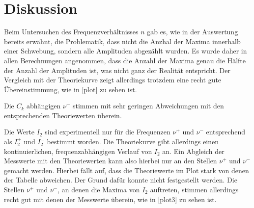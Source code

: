 \section{Diskussion}
\label{sec:Diskussion}

Beim Untersuchen des Frequenzverhältnisses $n$ gab es, wie in der Auswertung bereits erwähnt, die Problematik, dass nicht die Anzhal der 
Maxima innerhalb einer Schwebung, sondern alle Amplituden abgezählt wurden. Es wurde daher in allen Berechnungen angenommen, dass die 
Anzahl der Maxima genau die Hälfte der Anzahl der Amplituden ist, was nicht ganz der Realität entspricht. Der Vergleich mit der 
Theoriekurve zeigt allerdings trotzdem eine recht gute Übereinstimmung, wie in [plot] zu sehen ist.

Die $C_k$ abhängigen $\nu^-$ stimmen mit sehr geringen Abweichungen mit den entsprechenden Theoriewerten überein.

Die Werte $I_2$ sind experimentell nur für die Frequenzen $\nu^+$ und $\nu^-$ entsprechend als $I_2^+$ und $I_2^-$ bestimmt worden.
Die Theoriekurve gibt allerdings einen kontinuierlichen, frequenzabhängigen Verlauf von $I_2$ an. Ein Abgleich der Messwerte mit den 
Theoriewerten kann also hierbei nur an den Stellen $\nu^+$ und $\nu^-$ gemacht werden. Hierbei fällt auf, dass die Theoriewerte im 
Plot stark von denen der Tabelle abweichen. Der Grund dafür konnte nicht festgestellt werden. Die Stellen $\nu^+$ und $\nu^-$, an denen die Maxima von 
$I_2$ auftreten, stimmen allerdings recht gut mit denen der Messwerte überein, wie in [plot3] zu sehen ist.

